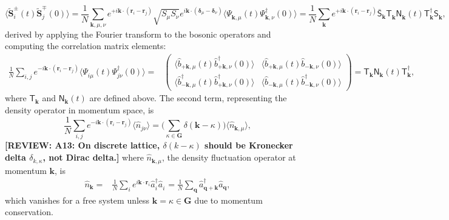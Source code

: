 \documentclass[aps, prx, nofootinbib, superscriptaddress]{revtex4-2}
\newcommand{\REVIEW}[1]{{\color{reviewcolor}\bfseries [REVIEW: #1]}}
\newcommand{\kvec}{\mathbf{k}}
\begin{document}
\begin{equation}
    \big\langle \widetilde{\mathbf{S}}_{i}^{\pm}(t) \widetilde{\mathbf{S}}_{j}^{\mp}(0) \big\rangle
    = \frac{1}{N} \sum_{\kvec, \mu, \nu } 
    e^{ + i \kvec \cdot (\mathbf{r}_{i} - \mathbf{r}_{j} )} 
    \sqrt{S_{\mu} S_{\nu}} 
    e^{ i \kvec \cdot (\mathbf{\delta}_{\mu} - \mathbf{\delta}_{\nu}) }
    \big\langle \Psi_{\kvec, \mu}^{\phantom \dagger}(t) \Psi_{\kvec, \nu}^{\dagger}(0) \big\rangle
    = \frac{1}{N} \sum_{\kvec} 
    e^{ + i \kvec \cdot (\mathbf{r}_{i} - \mathbf{r}_{j} )} 
    \bar{\mathsf{S}}_{\kvec}^{\phantom \dagger} 
    \mathsf{T}_{\kvec}^{\phantom \dagger}
    \mathsf{N}_{\kvec}^{\phantom \dagger} (t)
    \mathsf{T}_{\kvec}^{\dagger} 
    \mathsf{S}_{\kvec}^{\phantom \dagger},
\end{equation}
derived by applying the Fourier transform to the bosonic operators and computing the correlation matrix elements:
\begin{align}
    \frac{1}{N} \sum_{i,j} e^{ - i \kvec \cdot (\mathbf{r}_{i} - \mathbf{r}_{j} )} 
    \big\langle \Psi_{i\mu}^{\phantom \dagger}(t) \Psi_{j\nu}^{\dagger}(0) \big\rangle 
    = & 
    \begin{pmatrix}
        \big\langle \hat{b}_{+\kvec, \mu}^{\phantom \dagger} (t) \hat{b}_{+\kvec, \nu}^{\dagger}          (0) \big\rangle &
        \big\langle \hat{b}_{+\kvec, \mu}^{\phantom \dagger} (t) \hat{b}_{-\kvec, \nu}^{\phantom \dagger} (0) \big\rangle \\
        \big\langle \hat{b}_{-\kvec, \mu}^{\dagger}          (t) \hat{b}_{+\kvec, \nu}^{\dagger}          (0) \big\rangle &
        \big\langle \hat{b}_{-\kvec, \mu}^{\phantom \dagger} (t) \hat{b}_{-\kvec, \nu}^{\dagger}          (0) \big\rangle 
    \end{pmatrix}
    = \mathsf{T}_{\kvec}^{\phantom\dagger} \mathsf{N}_{\kvec}^{\phantom\dagger} (t) \mathsf{T}_{\kvec}^{\dagger},
\end{align}
where $\mathsf{T}_{\kvec}$ and $\mathsf{N}_{\kvec}(t)$ are defined above. The second term, representing the density operator in momentum space, is
\begin{equation}
    \frac{1}{N} \sum_{i,j} e^{- i \kvec \cdot (\mathbf{r}_{i} - \mathbf{r}_{j})} \langle \hat{n}_{j\nu} \rangle
    = \Big( \sum_{\kappa \in \mathbf{G}} \delta(\kvec - \kappa) \Big) \langle \hat{n}_{\kvec, \mu} \rangle,
\end{equation}
\REVIEW{A13: On discrete lattice, $\delta(k-\kappa)$ should be Kronecker delta $\delta_{k,\kappa}$, not Dirac delta.}
where $\hat{n}_{\kvec, \mu}$, the density fluctuation operator at momentum $\kvec$, is
\begin{align*}
    \hat{n}_{\kvec} 
    = & \frac{1}{N} 
    \sum_{i} e^{i \kvec \cdot \mathbf{r}_{i}} \hat{a}^{\dagger}_{i} \hat{a}_{i}^{\phantom \dagger} 
    = \frac{1}{N}  \sum_{\mathbf{q}} \hat{a}_{\mathbf{q} + \kvec}^{\dagger} \hat{a}_{\mathbf{q}}^{\phantom \dagger},
\end{align*}
which vanishes for a free system unless $\kvec = \kappa \in \mathbf{G}$ due to momentum conservation.
\end{document}
